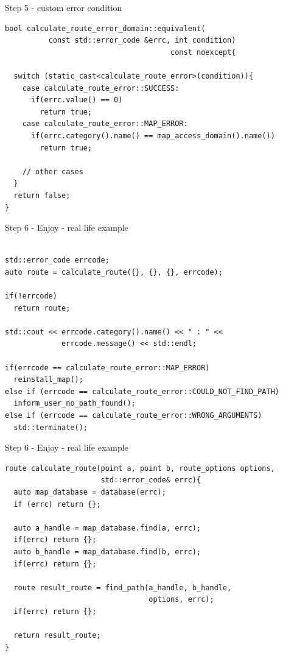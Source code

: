 \documentclass[10pt]{beamer}
\begin{document}
\begin{frame}[fragile]{Step 5 - custom error condition}
	\begin{verbatim}
bool calculate_route_error_domain::equivalent(
          const std::error_code &errc, int condition) 
                                      const noexcept{
                                      
  switch (static_cast<calculate_route_error>(condition)){
    case calculate_route_error::SUCCESS:
      if(errc.value() == 0)
        return true;
    case calculate_route_error::MAP_ERROR:
      if(errc.category().name() == map_access_domain().name())
        return true;
        
    // other cases
  }
  return false;
}
	\end{verbatim}
\end{frame}

\begin{frame}[fragile]{Step 6 - Enjoy - real life example}
	\begin{verbatim}

std::error_code errcode;
auto route = calculate_route({}, {}, {}, errcode);

if(!errcode)
  return route;

std::cout << errcode.category().name() << " : " <<
             errcode.message() << std::endl;

if(errcode == calculate_route_error::MAP_ERROR)
  reinstall_map();
else if (errcode == calculate_route_error::COULD_NOT_FIND_PATH)
  inform_user_no_path_found();
else if (errcode == calculate_route_error::WRONG_ARGUMENTS)
  std::terminate();
	\end{verbatim}
\end{frame}

\begin{frame}[fragile]{Step 6 - Enjoy - real life example}
	\begin{verbatim}
route calculate_route(point a, point b, route_options options,
                      std::error_code& errc){
  auto map_database = database(errc);
  if (errc) return {};

  auto a_handle = map_database.find(a, errc);
  if(errc) return {};
  auto b_handle = map_database.find(b, errc);
  if(errc) return {};

  route result_route = find_path(a_handle, b_handle,
                                 options, errc);
  if(errc) return {};

  return result_route;
}
	\end{verbatim}
\end{frame}
\end{document}

